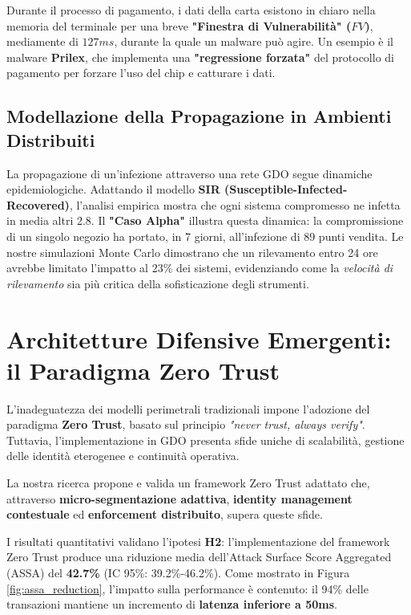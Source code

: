 Durante il processo di pagamento, i dati della carta esistono in chiaro nella memoria del terminale per una breve \textbf{"Finestra di Vulnerabilità" ($FV$)}, mediamente di $127ms$\autocite{SecureRetailLabs2024}, durante la quale un malware può agire. Un esempio è il malware \textbf{Prilex}, che implementa una \textbf{"regressione forzata"} del protocollo di pagamento per forzare l'uso del chip e catturare i dati\autocite{kaspersky2024}.

\subsection{Modellazione della Propagazione in Ambienti Distribuiti}
La propagazione di un'infezione attraverso una rete GDO segue dinamiche epidemiologiche. Adattando il modello \textbf{SIR (Susceptible-Infected-Recovered)}\autocite{andersonmiller}, l'analisi empirica mostra che ogni sistema compromesso ne infetta in media altri 2.8. Il \textbf{"Caso Alpha"}\autocite{sans2024} illustra questa dinamica: la compromissione di un singolo negozio ha portato, in 7 giorni, all'infezione di 89 punti vendita. Le nostre simulazioni Monte Carlo dimostrano che un rilevamento entro 24 ore avrebbe limitato l'impatto al 23\% dei sistemi, evidenziando come la \textit{velocità di rilevamento} sia più critica della sofisticazione degli strumenti.

\section{Architetture Difensive Emergenti: il Paradigma Zero Trust}
L'inadeguatezza dei modelli perimetrali tradizionali impone l'adozione del paradigma \textbf{Zero Trust}, basato sul principio \textit{"never trust, always verify"}. Tuttavia, l'implementazione in GDO presenta sfide uniche di scalabilità, gestione delle identità eterogenee e continuità operativa.

La nostra ricerca propone e valida un framework Zero Trust adattato che, attraverso \textbf{micro-segmentazione adattiva}, \textbf{identity management contestuale} ed \textbf{enforcement distribuito}, supera queste sfide.

I risultati quantitativi validano l'ipotesi \textbf{H2}: l'implementazione del framework Zero Trust produce una riduzione media dell'Attack Surface Score Aggregated (ASSA) del \textbf{42.7\%} (IC 95\%: 39.2\%-46.2\%). Come mostrato in Figura \ref{fig:assa_reduction}, l'impatto sulla performance è contenuto: il 94\% delle transazioni mantiene un incremento di \textbf{latenza inferiore a 50ms}.

